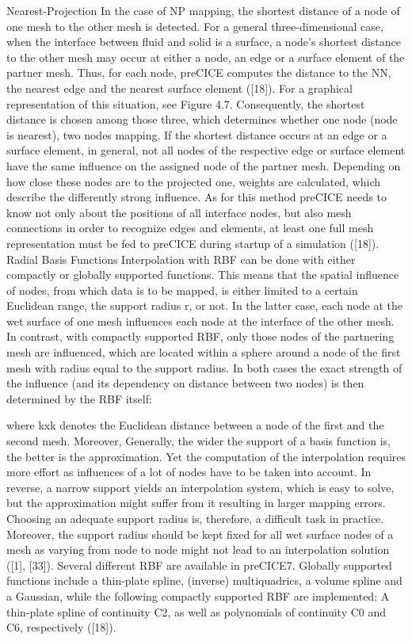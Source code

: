 Nearest-Projection
In the case of NP mapping, the shortest distance of a node of one mesh to the other mesh is detected. For
a general three-dimensional case, when the interface between fluid and solid is a surface, a node’s shortest
distance to the other mesh may occur at either a node, an edge or a surface element of the partner mesh.
Thus, for each node, preCICE computes the distance to the NN, the nearest edge and the nearest surface
element ([18]). For a graphical representation of this situation, see Figure 4.7. Consequently, the shortest
distance is chosen among those three, which determines whether one node (node is nearest), two nodes
mapping. If the shortest distance occurs at an edge or a surface element, in general, not all nodes of the
respective edge or surface element have the same influence on the assigned node of the partner mesh.
Depending on how close these nodes are to the projected one, weights are calculated, which describe the
differently strong influence. As for this method preCICE needs to know not only about the positions of
all interface nodes, but also mesh connections in order to recognize edges and elements, at least one full
mesh representation must be fed to preCICE during startup of a simulation ([18]).
Radial Basis Functions
Interpolation with RBF can be done with either compactly or globally supported functions. This means
that the spatial influence of nodes, from which data is to be mapped, is either limited to a certain
Euclidean range, the support radius r, or not. In the latter case, each node at the wet surface of one
mesh influences each node at the interface of the other mesh. In contrast, with compactly supported
RBF, only those nodes of the partnering mesh are influenced, which are located within a sphere around
a node of the first mesh with radius equal to the support radius. In both cases the exact strength of the
influence (and its dependency on distance between two nodes) is then determined by the RBF itself:

where kxk denotes the Euclidean distance between a node of the first and the second mesh. Moreover,
Generally, the wider the support of a basis function is, the better is the approximation. Yet the computation
of the interpolation requires more effort as influences of a lot of nodes have to be taken into
account. In reverse, a narrow support yields an interpolation system, which is easy to solve, but the
approximation might suffer from it resulting in larger mapping errors. Choosing an adequate support
radius is, therefore, a difficult task in practice. Moreover, the support radius should be kept fixed for all
wet surface nodes of a mesh as varying from node to node might not lead to an interpolation solution
([1], [33]).
Several different RBF are available in preCICE7. Globally supported functions include a thin-plate spline,
(inverse) multiquadrics, a volume spline and a Gaussian, while the following compactly supported RBF
are implemented: A thin-plate spline of continuity C2, as well as polynomials of continuity C0 and C6,
respectively ([18]).

